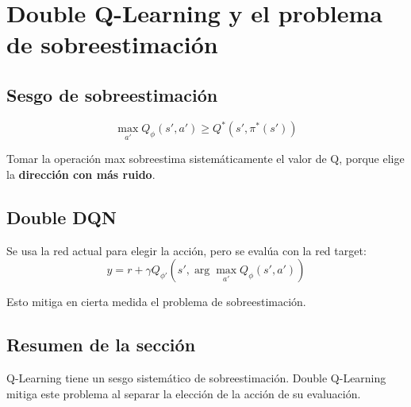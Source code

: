 \section{Double Q-Learning y el problema de sobreestimación}

\subsection{Sesgo de sobreestimación}

$$\max_{a'} Q_\phi(s', a') \geq Q^*(s', \pi^*(s'))$$

Tomar la operación max sobreestima sistemáticamente el valor de Q, porque elige la \textbf{dirección con más ruido}.

\subsection{Double DQN}

Se usa la red actual para elegir la acción, pero se evalúa con la red target:
$$y = r + \gamma Q_{\phi'}\left(s', \arg\max_{a'} Q_\phi(s', a')\right)$$

Esto mitiga en cierta medida el problema de sobreestimación.

\subsection{Resumen de la sección}

Q-Learning tiene un sesgo sistemático de sobreestimación. Double Q-Learning mitiga este problema al separar la elección de la acción de su evaluación.

